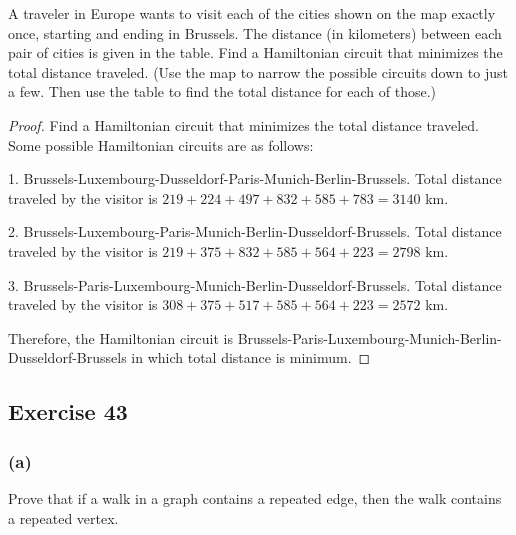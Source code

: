 \documentclass[14pt]{extarticle}
\begin{document}
A traveler in Europe wants to visit each of the cities shown on the map exactly once, starting and ending in Brussels. The 
distance (in kilometers) between each pair of cities is given in the table. Find a Hamiltonian circuit that minimizes the 
total distance traveled. (Use the map to narrow the possible circuits down to just a few. Then use the table to find the 
total distance for each of those.)

\begin{proof}
Find a Hamiltonian circuit that minimizes the total distance traveled. Some possible Hamiltonian circuits are as follows:

1. Brussels-Luxembourg-Dusseldorf-Paris-Munich-Berlin-Brussels. Total distance traveled by the visitor is \(219 + 
224 + 497 + 832 + 585 + 783 = 3140\) km.

2. Brussels-Luxembourg-Paris-Munich-Berlin-Dusseldorf-Brussels. Total distance traveled by the visitor is \(219 + 
375 + 832 + 585 + 564 + 223 = 2798\) km.

3. Brussels-Paris-Luxembourg-Munich-Berlin-Dusseldorf-Brussels. Total distance traveled by the visitor is \(308 + 
375 + 517 + 585 + 564 + 223 = 2572\) km.

Therefore, the Hamiltonian circuit is Brussels-Paris-Luxembourg-Munich-Berlin- \\ Dusseldorf-Brussels in which 
total distance is minimum.
\end{proof}

\subsection{Exercise 43}
\subsubsection{(a)}
Prove that if a walk in a graph contains a repeated edge, then the walk contains a repeated vertex.
\end{document}
